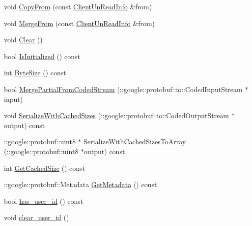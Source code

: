 \begin{DoxyCompactItemize}
\item 
void \hyperlink{class_i_m_1_1_base_define_1_1_client_un_read_info_a7ef7a6cc5707caca06c8680ce5089672}{Copy\+From} (const \hyperlink{class_i_m_1_1_base_define_1_1_client_un_read_info}{Client\+Un\+Read\+Info} \&from)
\item 
void \hyperlink{class_i_m_1_1_base_define_1_1_client_un_read_info_ac992b2fddd9d1180c6f4ae202402a900}{Merge\+From} (const \hyperlink{class_i_m_1_1_base_define_1_1_client_un_read_info}{Client\+Un\+Read\+Info} \&from)
\item 
void \hyperlink{class_i_m_1_1_base_define_1_1_client_un_read_info_ab581917f268dc57019ca602ce10f6aa4}{Clear} ()
\item 
bool \hyperlink{class_i_m_1_1_base_define_1_1_client_un_read_info_a0380b71c22caf798337b7469d3507071}{Is\+Initialized} () const 
\item 
int \hyperlink{class_i_m_1_1_base_define_1_1_client_un_read_info_a4fbcbdb7357c3e80641f0a60036a2e1f}{Byte\+Size} () const 
\item 
bool \hyperlink{class_i_m_1_1_base_define_1_1_client_un_read_info_ac5ad57ba030c41dd7a4fc77a7b08b5cd}{Merge\+Partial\+From\+Coded\+Stream} (\+::google\+::protobuf\+::io\+::\+Coded\+Input\+Stream $\ast$input)
\item 
void \hyperlink{class_i_m_1_1_base_define_1_1_client_un_read_info_a36cf201bd42653acbca4695e4c6a4167}{Serialize\+With\+Cached\+Sizes} (\+::google\+::protobuf\+::io\+::\+Coded\+Output\+Stream $\ast$output) const 
\item 
\+::google\+::protobuf\+::uint8 $\ast$ \hyperlink{class_i_m_1_1_base_define_1_1_client_un_read_info_aa26f2e4dadcbe6f196e04fdd3abf93f0}{Serialize\+With\+Cached\+Sizes\+To\+Array} (\+::google\+::protobuf\+::uint8 $\ast$output) const 
\item 
int \hyperlink{class_i_m_1_1_base_define_1_1_client_un_read_info_ab316a99175eea247b0ed94ba9f821e9f}{Get\+Cached\+Size} () const 
\item 
\+::google\+::protobuf\+::\+Metadata \hyperlink{class_i_m_1_1_base_define_1_1_client_un_read_info_a1e365f5215382fd263450a5520e53dc6}{Get\+Metadata} () const 
\item 
bool \hyperlink{class_i_m_1_1_base_define_1_1_client_un_read_info_ac1a7e007205106a8b8fb4045a327dc62}{has\+\_\+user\+\_\+id} () const 
\item 
void \hyperlink{class_i_m_1_1_base_define_1_1_client_un_read_info_a500b247f648799b0880d45dfee4d5832}{clear\+\_\+user\+\_\+id} ()
\item 

\end{DoxyCompactItemize}
